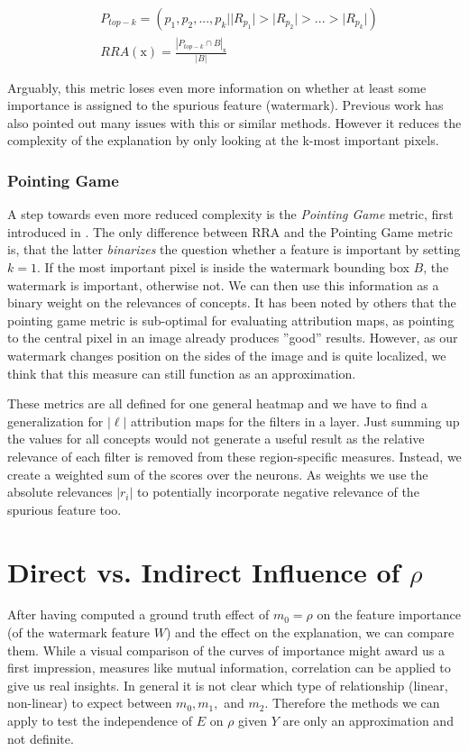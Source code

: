 \begin{align*}
& P_{top-k} = (p_1, p_2,...,p_k | |R_{p_1}| > |R_{p_2}| > ... > |R_{p_k}| ) \\
& RRA(\mathrm{x}) = \frac{|P_{top-k} \cap B|_\mathrm{x}}{|B|} 
\end{align*}

Arguably, this metric loses even more information on whether at least some importance is assigned to the spurious feature (watermark). Previous work has also pointed out many issues with this or similar methods. However it reduces the complexity of the explanation by only looking at the k-most important pixels. \\

\subsubsection{Pointing Game}
A step towards even more reduced complexity is the \textit{Pointing Game} metric, first introduced in \cite{Zhang2016}. The only difference between RRA and the Pointing Game metric is, that the latter \textit{binarizes} the question whether a feature is important by setting $k = 1$. If the most important pixel is inside the watermark bounding box $B$, the watermark is important, otherwise not.
We can then use this information as a binary weight on the relevances of concepts. 
It has been noted by others that the pointing game metric is sub-optimal for evaluating attribution maps, as pointing to the central pixel in an image already produces ''good'' results. However, as our watermark changes position on the sides of the image and is quite localized, we think that this measure can still function as an approximation. 

These metrics are all defined for one general heatmap and we have to find a generalization for $|\ell|$ attribution maps for the filters in a layer. Just summing up the values for all concepts would not generate a useful result as the relative relevance of each filter is removed from these region-specific measures. Instead, we create a weighted sum of the scores over the neurons. As weights we use the absolute relevances $|r_i|$ to potentially incorporate negative relevance of the spurious feature too. 

\section{Direct vs. Indirect Influence of $\rho$}
After having computed a ground truth effect of $m_0 = \rho$ on the feature importance (of the watermark feature $W$) and the effect on the explanation, we can compare them.
While a visual comparison of the curves of importance might award us a first impression, measures like mutual information, correlation can be applied to give us real insights. 
In general it is not clear which type of relationship (linear, non-linear) to expect between $m_0, m_1, $ and $m_2$. Therefore the methods we can apply to test the independence of $E$ on $\rho$ given $Y$ are only an approximation and not definite.

